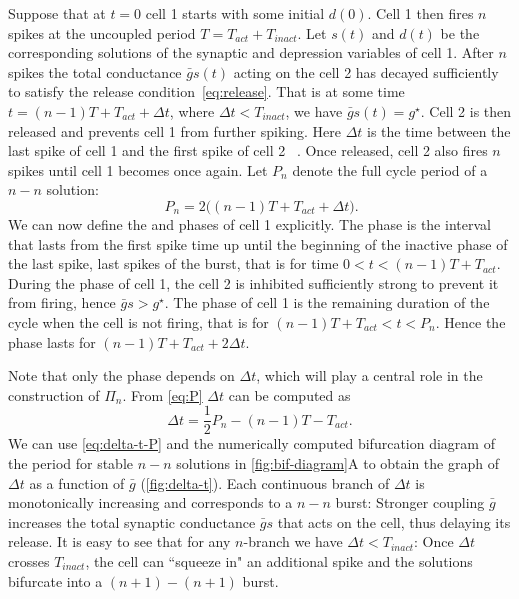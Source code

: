 Suppose that at \(t=0\) cell 1 starts \free{} with some initial \(d(0)\). Cell 1 then fires \(n\) spikes at the uncoupled period \(T=T_{act}+T_{inact}\).
Let \(s(t)\) and \(d(t)\) be the corresponding solutions of the synaptic and depression variables of cell 1.
After \(n\) spikes the total conductance \(\bar g s(t)\) acting on the \quiet{} cell 2 has decayed sufficiently to satisfy the release condition~\eqref{eq:release}.
That is at some time \(t=(n-1)T + T_{act} + \Delta t\), where \(\Delta t < T_{inact}\), we have \(\bar g s(t)=g^{\star}\).
Cell 2 is then released and prevents cell 1 from further spiking.
Here \(\Delta t\) is the time between the last spike of cell 1 and the first spike of cell 2 ~\citep{bose2011}.
Once released, cell 2 also fires \(n\) spikes until cell 1 becomes \free{} once again.
Let \(P_n\) denote the full cycle period of a \(n-n\) solution:
\begin{equation}
	~\label{eq:P}
	P_n = 2\Big( (n-1)T + T_{act} + \Delta t \Big).
\end{equation}
We can now define the \free{} and \quiet{} phases of cell 1 explicitly.
The \free{} phase is the interval that lasts from the first spike time up until the beginning of the inactive phase of the last spike, last spikes of the burst, that is for time \(0<t<(n-1)T + T_{act}\).
During the \free{} phase of cell 1, the \quiet{} cell 2 is inhibited sufficiently strong to prevent it from firing, hence \(\bar g s > g^{\star}\).
The \quiet{} phase of cell 1 is the remaining duration of the cycle when the cell is not firing, that is for \((n-1)T + T_{act} < t < P_n\).
Hence the \quiet{} phase lasts for \((n-1)T + T_{act} + 2\Delta t\).

Note that only the \quiet{} phase depends on \(\Delta t\), which will play a central role in the construction of \(\Pi_n\).
From \cref{eq:P} \(\Delta t\) can be computed as
\begin{equation}
	\label{eq:delta-t-P}
	\Delta t = \frac{1}{2}P_n - (n-1)T - T_{act}.
\end{equation}
We can use \cref{eq:delta-t-P} and the numerically computed bifurcation diagram of the period for stable \(n-n\) solutions in \cref{fig:bif-diagram}A to obtain the graph of \(\Delta t\) as a function of \(\bar g\) (\cref{fig:delta-t}).
Each continuous branch of \(\Delta t\) is monotonically increasing and corresponds to a \(n-n\) burst:
Stronger coupling \(\bar g\) increases the total synaptic conductance \(\bar g s\) that acts on the \quiet{} cell, thus delaying its release.
It is easy to see that for any \(n\)-branch we have \(\Delta t < T_{inact}\):
Once \(\Delta t\) crosses \(T_{inact}\), the \free{} cell can ``squeeze in" an additional spike and the solutions bifurcate into a \((n+1)-(n+1)\) burst.

